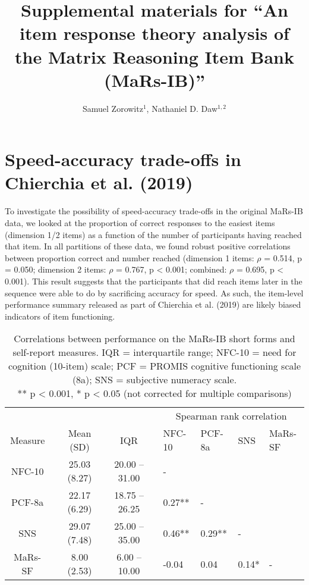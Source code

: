 \documentclass[a4paper,man,natbib]{apa6}
\title{Supplemental materials for ``An item response theory analysis of the Matrix Reasoning Item Bank (MaRs-IB)''}
\author{Samuel Zorowitz$^1$, Nathaniel D. Daw$^{1,2}$}
\affiliation{$^1$Princeton Neuroscience Institute, Princeton University, USA\\$^2$Department of Psychology, Princeton University, USA}
\begin{document}
\maketitle

\section*{Speed-accuracy trade-offs in Chierchia et al. (2019)}

To investigate the possibility of speed-accuracy trade-offs in the original MaRs-IB data, we looked at the proportion of correct responses to the easiest items (dimension 1/2 items) as a function of the number of participants having reached that item. In all partitions of these data, we found robust positive correlations between proportion correct and number reached (dimension 1 items: $\rho$ = 0.514, p = 0.050; dimension 2 items: $\rho$ = 0.767, p < 0.001; combined: $\rho$ = 0.695, p < 0.001). This result suggests that the participants that did reach items later in the sequence were able to do by sacrificing accuracy for speed. As such, the item-level performance summary released as part of Chierchia et al. (2019) are likely biased indicators of item functioning.

\begin{table}
\centering
\begin{tabular*}{\textwidth}{ccccccllll}
\toprule
 & & & & & & \multicolumn{4}{c}{Spearman rank correlation} \\
\cmidrule(lr){7-10}
Measure & & Mean (SD) & & IQR & &  NFC-10 & PCF-8a & SNS & MaRs-SF \\
\midrule
NFC-10 & & 25.03 (8.27) & & 20.00 -- 31.00 & & - &  &  & \\
PCF-8a   &  & 22.17 (6.29) & & 18.75 -- 26.25 & & 0.27** &  - &  &  \\
SNS   &  & 29.07 (7.48) & & 25.00 -- 35.00 & & 0.46** &  0.29** &  - &   \\
MaRs-SF & &   8.00 (2.53) & &   6.00 -- 10.00 & & -0.04 &  0.04 &  0.14* &  - \\
\bottomrule
\end{tabular*}
\captionsetup{width=1.\textwidth}
\caption{\normalfont Correlations between performance on the MaRs-IB short forms and self-report measures. IQR = interquartile range; NFC-10 = need for cognition (10-item) scale; PCF = PROMIS cognitive functioning scale (8a); SNS = subjective numeracy scale. \\ ** p < 0.001,  * p < 0.05 (not corrected for multiple comparisons)}
\end{table}
\end{document}
